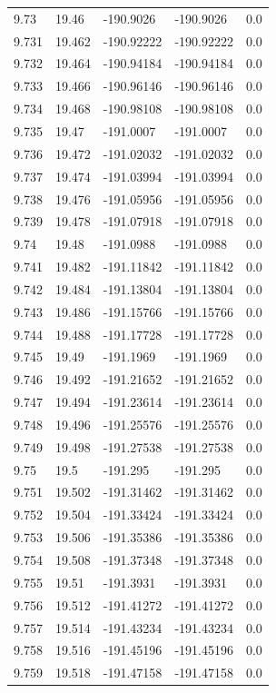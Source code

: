 \begin{tabular}{lllll}
9.73 & 19.46 & -190.9026 & -190.9026 & 0.0 \\
9.731 & 19.462 & -190.92222 & -190.92222 & 0.0 \\
9.732 & 19.464 & -190.94184 & -190.94184 & 0.0 \\
9.733 & 19.466 & -190.96146 & -190.96146 & 0.0 \\
9.734 & 19.468 & -190.98108 & -190.98108 & 0.0 \\
9.735 & 19.47 & -191.0007 & -191.0007 & 0.0 \\
9.736 & 19.472 & -191.02032 & -191.02032 & 0.0 \\
9.737 & 19.474 & -191.03994 & -191.03994 & 0.0 \\
9.738 & 19.476 & -191.05956 & -191.05956 & 0.0 \\
9.739 & 19.478 & -191.07918 & -191.07918 & 0.0 \\
9.74 & 19.48 & -191.0988 & -191.0988 & 0.0 \\
9.741 & 19.482 & -191.11842 & -191.11842 & 0.0 \\
9.742 & 19.484 & -191.13804 & -191.13804 & 0.0 \\
9.743 & 19.486 & -191.15766 & -191.15766 & 0.0 \\
9.744 & 19.488 & -191.17728 & -191.17728 & 0.0 \\
9.745 & 19.49 & -191.1969 & -191.1969 & 0.0 \\
9.746 & 19.492 & -191.21652 & -191.21652 & 0.0 \\
9.747 & 19.494 & -191.23614 & -191.23614 & 0.0 \\
9.748 & 19.496 & -191.25576 & -191.25576 & 0.0 \\
9.749 & 19.498 & -191.27538 & -191.27538 & 0.0 \\
9.75 & 19.5 & -191.295 & -191.295 & 0.0 \\
9.751 & 19.502 & -191.31462 & -191.31462 & 0.0 \\
9.752 & 19.504 & -191.33424 & -191.33424 & 0.0 \\
9.753 & 19.506 & -191.35386 & -191.35386 & 0.0 \\
9.754 & 19.508 & -191.37348 & -191.37348 & 0.0 \\
9.755 & 19.51 & -191.3931 & -191.3931 & 0.0 \\
9.756 & 19.512 & -191.41272 & -191.41272 & 0.0 \\
9.757 & 19.514 & -191.43234 & -191.43234 & 0.0 \\
9.758 & 19.516 & -191.45196 & -191.45196 & 0.0 \\
9.759 & 19.518 & -191.47158 & -191.47158 & 0.0 \\

\end{tabular}
